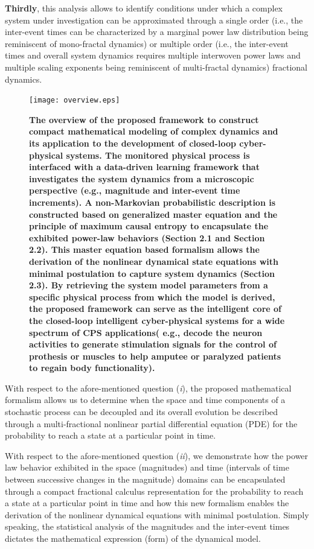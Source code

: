  \textbf{Thirdly}, this analysis allows to identify conditions under which a complex system under investigation can be approximated through a single order (i.e., the inter-event times can be characterized by a marginal power law distribution being reminiscent of mono-fractal dynamics) or multiple order (i.e., the inter-event times and overall system dynamics requires multiple interwoven power laws and multiple scaling exponents being reminiscent of multi-fractal dynamics) fractional dynamics.
\begin{figure}%
\centering
\texttt{[image: overview.eps]}
\caption{\textbf{The overview of the proposed framework to construct compact mathematical modeling of complex dynamics and its application to the development of closed-loop cyber-physical systems. The monitored physical process is interfaced with a data-driven learning framework that investigates the system dynamics from a microscopic perspective (e.g., magnitude and inter-event time increments). A non-Markovian probabilistic description is constructed based on generalized master equation and the principle of maximum causal entropy to encapsulate the exhibited power-law behaviors (Section 2.1 and Section 2.2). This master equation based formalism allows the derivation of the nonlinear dynamical state equations with minimal postulation to capture system dynamics (Section 2.3). By retrieving the system model parameters from a specific physical process from which the model is derived, the proposed framework can serve as the intelligent core of the closed-loop intelligent cyber-physical systems for a wide spectrum of CPS applications( e.g., decode the neuron activities to generate stimulation signals for the control of prothesis or muscles to help amputee or paralyzed patients to regain body functionality).}}
\label{fig:overview}
\vskip -1mm
\end{figure} 
  With respect to the afore-mentioned question (\textit{i}), the proposed mathematical formalism allows us to determine when the space and time components of a stochastic process can be decoupled and its overall evolution be described through a multi-fractional nonlinear partial differential equation (PDE) for the probability to reach a state at a particular point in time. 
  
  With respect to the afore-mentioned question (\textit{ii}), we demonstrate how the power law behavior exhibited in the space (magnitudes) and time (intervals of time between successive changes in the magnitude) domains can be encapsulated through a compact fractional calculus representation for the  probability to reach a state at a particular point in time and how this new formalism enables the derivation of the nonlinear dynamical equations with minimal postulation. Simply speaking, the statistical analysis of the magnitudes and the inter-event times dictates the mathematical expression (form) of the dynamical model. 
  
